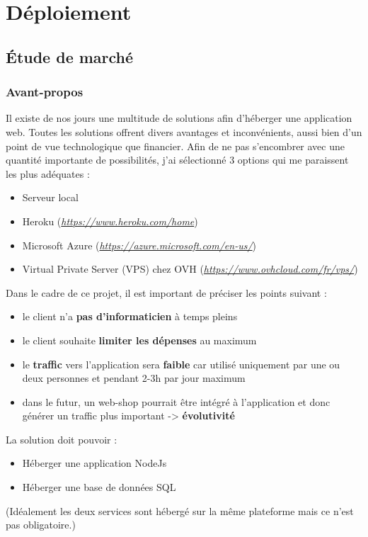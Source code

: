 \section{Déploiement}
\subsection{Étude de marché}
\subsubsection{Avant-propos}
Il existe de nos jours une multitude de solutions afin d'héberger une application web. Toutes les solutions offrent divers avantages et inconvénients, aussi bien d'un point de vue technologique que financier. Afin de ne pas s'encombrer avec une quantité importante de possibilités, j'ai sélectionné 3 options qui me paraissent les plus adéquates :
\begin{itemize}
  \item Serveur local
  \item Heroku (\textit{\url{https://www.heroku.com/home}})
  \item Microsoft Azure (\textit{\url{https://azure.microsoft.com/en-us/}})
  \item Virtual Private Server (VPS) chez OVH (\textit{\url{https://www.ovhcloud.com/fr/vps/}})
\end{itemize}

\newpara

Dans le cadre de ce projet, il est important de préciser les points suivant :
\begin{itemize}
  \item le client n'a \textbf{pas d'informaticien} à temps pleins
  \item le client souhaite \textbf{limiter les dépenses} au maximum
  \item le \textbf{traffic} vers l'application sera \textbf{faible} car utilisé uniquement par une ou deux personnes et pendant 2-3h par jour maximum
  \item dans le futur, un web-shop pourrait être intégré à l'application et donc générer un traffic plus important -> \textbf{évolutivité}
\end{itemize}

\newpara

La solution doit pouvoir :
\begin{itemize}
  \item Héberger une application NodeJs
  \item Héberger une base de données SQL
\end{itemize}
(Idéalement les deux services sont hébergé sur la même plateforme mais ce n'est pas obligatoire.)

